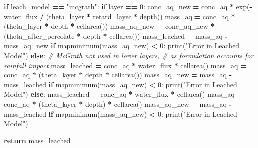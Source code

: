 \documentclass[]{article}
\newenvironment{Shaded}{\begin{snugshade}}{\end{snugshade}}
\newcommand{\DecValTok}[1]{\textcolor[rgb]{0.00,0.00,0.81}{{#1}}}
\newcommand{\StringTok}[1]{\textcolor[rgb]{0.31,0.60,0.02}{{#1}}}
\newcommand{\CommentTok}[1]{\textcolor[rgb]{0.56,0.35,0.01}{\textit{{#1}}}}
\newcommand{\ControlFlowTok}[1]{\textcolor[rgb]{0.13,0.29,0.53}{\textbf{{#1}}}}
\newcommand{\OperatorTok}[1]{\textcolor[rgb]{0.81,0.36,0.00}{\textbf{{#1}}}}
\newcommand{\BuiltInTok}[1]{{#1}}
\newcommand{\NormalTok}[1]{{#1}}
\begin{document}
\begin{Shaded}
\begin{Highlighting}[]
    \ControlFlowTok{if} \NormalTok{leach_model }\OperatorTok{==} \StringTok{"mcgrath"}\NormalTok{:}
        \ControlFlowTok{if} \NormalTok{layer }\OperatorTok{==} \DecValTok{0}\NormalTok{:}
            \NormalTok{conc_aq_new }\OperatorTok{=} \NormalTok{conc_aq }\OperatorTok{*} \NormalTok{exp(}\OperatorTok{-}\NormalTok{water_flux }\OperatorTok{/} \NormalTok{(theta_layer }\OperatorTok{*} \NormalTok{retard_layer }\OperatorTok{*} \NormalTok{depth))}
            \NormalTok{mass_aq }\OperatorTok{=} \NormalTok{conc_aq }\OperatorTok{*} \NormalTok{(theta_layer }\OperatorTok{*} \NormalTok{depth }\OperatorTok{*} \NormalTok{cellarea())}
            \NormalTok{mass_aq_new }\OperatorTok{=} \NormalTok{conc_aq_new }\OperatorTok{*} \NormalTok{(theta_after_percolate }\OperatorTok{*} \NormalTok{depth }\OperatorTok{*} \NormalTok{cellarea())}
            \NormalTok{mass_leached }\OperatorTok{=} \NormalTok{mass_aq }\OperatorTok{-} \NormalTok{mass_aq_new}
            \ControlFlowTok{if} \NormalTok{mapminimum(mass_aq_new) }\OperatorTok{<} \DecValTok{0}\NormalTok{:}
                \BuiltInTok{print}\NormalTok{(}\StringTok{"Error in Leached Model"}\NormalTok{)}
        \ControlFlowTok{else}\NormalTok{:}
            \CommentTok{# McGrath not used in lower layers,}
            \CommentTok{# as formulation accounts for rainfall impact}
            \NormalTok{mass_leached }\OperatorTok{=} \NormalTok{conc_aq }\OperatorTok{*} \NormalTok{water_flux }\OperatorTok{*} \NormalTok{cellarea()}
            \NormalTok{mass_aq }\OperatorTok{=} \NormalTok{conc_aq }\OperatorTok{*} \NormalTok{(theta_layer }\OperatorTok{*} \NormalTok{depth }\OperatorTok{*} \NormalTok{cellarea())}
            \NormalTok{mass_aq_new }\OperatorTok{=} \NormalTok{mass_aq }\OperatorTok{-} \NormalTok{mass_leached}
            \ControlFlowTok{if} \NormalTok{mapminimum(mass_aq_new) }\OperatorTok{<} \DecValTok{0}\NormalTok{:}
                \BuiltInTok{print}\NormalTok{(}\StringTok{"Error in Leached Model"}\NormalTok{)}
    \ControlFlowTok{else}\NormalTok{:}
        \NormalTok{mass_leached }\OperatorTok{=} \NormalTok{conc_aq }\OperatorTok{*} \NormalTok{water_flux }\OperatorTok{*} \NormalTok{cellarea()}
        \NormalTok{mass_aq }\OperatorTok{=} \NormalTok{conc_aq }\OperatorTok{*} \NormalTok{(theta_layer }\OperatorTok{*} \NormalTok{depth) }\OperatorTok{*} \NormalTok{cellarea()}
        \NormalTok{mass_aq_new }\OperatorTok{=} \NormalTok{mass_aq }\OperatorTok{-} \NormalTok{mass_leached}
        \ControlFlowTok{if} \NormalTok{mapminimum(mass_aq_new) }\OperatorTok{<} \DecValTok{0}\NormalTok{:}
            \BuiltInTok{print}\NormalTok{(}\StringTok{"Error in Leached Model"}\NormalTok{)}

    \ControlFlowTok{return} \NormalTok{mass_leached}
\end{Highlighting}
\end{Shaded}
\end{document}
